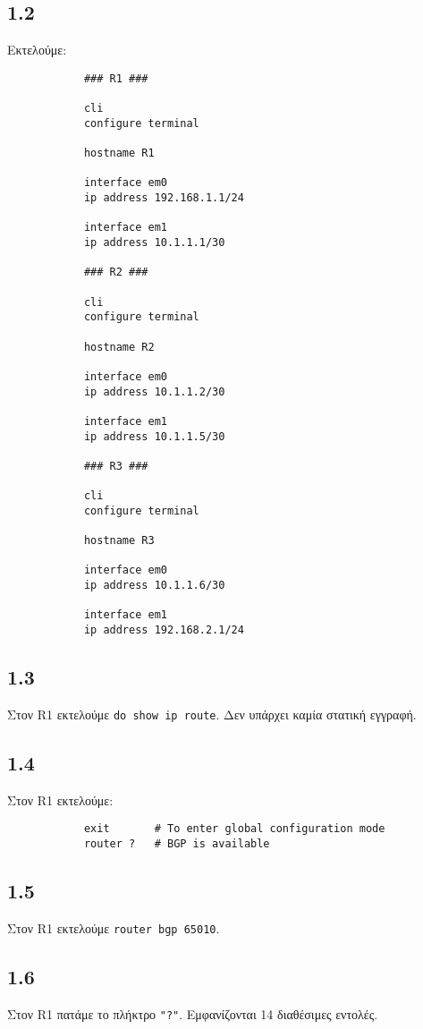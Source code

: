 \documentclass[a4paper, 12pt]{article}
\begin{document}
	\subsection*{1.2}
		Εκτελούμε:
		
		\begin{verbatim}
			### R1 ###
			
			cli 
			configure terminal
			
			hostname R1
			
			interface em0
			ip address 192.168.1.1/24
			
			interface em1
			ip address 10.1.1.1/30
			
			### R2 ###
			
			cli
			configure terminal
			
			hostname R2
			
			interface em0
			ip address 10.1.1.2/30
			
			interface em1
			ip address 10.1.1.5/30
			
			### R3 ###
			
			cli
			configure terminal
			
			hostname R3
			
			interface em0
			ip address 10.1.1.6/30
			
			interface em1
			ip address 192.168.2.1/24
		\end{verbatim}

	\subsection*{1.3}
		Στον R1 εκτελούμε \verb|do show ip route|. Δεν υπάρχει καμία στατική εγγραφή.

	\subsection*{1.4}
		Στον R1 εκτελούμε:
		
		\begin{verbatim}
			exit       # To enter global configuration mode
			router ?   # BGP is available
		\end{verbatim}

	\subsection*{1.5}
		Στον R1 εκτελούμε \verb|router bgp 65010|.

	\subsection*{1.6}
		Στον R1 πατάμε το πλήκτρο \verb|"?"|. Εμφανίζονται 14 διαθέσιμες εντολές.
\end{document}
